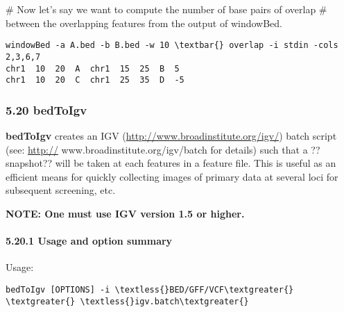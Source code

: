 \documentclass[letterpaper,10pt,english]{sphinxmanual}
\begin{document}
\# Now let's say we want to compute the number of base pairs of overlap
\# between the overlapping features from the output of windowBed.

\begin{Verbatim}[commandchars=\\\{\}]
windowBed -a A.bed -b B.bed -w 10 \textbar{} overlap -i stdin -cols 2,3,6,7
chr1  10  20  A  chr1  15  25  B  5
chr1  10  20  C  chr1  25  35  D  -5
\end{Verbatim}


\subsubsection{5.20 bedToIgv}
\label{content/bedToIgv:bedtoigv}\label{content/bedToIgv::doc}
\textbf{bedToIgv} creates an IGV (\href{http://www.broadinstitute.org/igv/}{http://www.broadinstitute.org/igv/}) batch script (see: \href{http://}{http://}
www.broadinstitute.org/igv/batch for details) such that a ??snapshot?? will be taken at each features in a
feature file. This is useful as an efficient means for quickly collecting images of primary data at several
loci for subsequent screening, etc.

\textbf{NOTE: One must use IGV version 1.5 or higher.}


\paragraph{5.20.1 Usage and option summary}
\label{content/bedToIgv:usage-and-option-summary}
Usage:

\begin{Verbatim}[commandchars=\\\{\}]
bedToIgv [OPTIONS] -i \textless{}BED/GFF/VCF\textgreater{} \textgreater{} \textless{}igv.batch\textgreater{}
\end{Verbatim}
\end{document}
